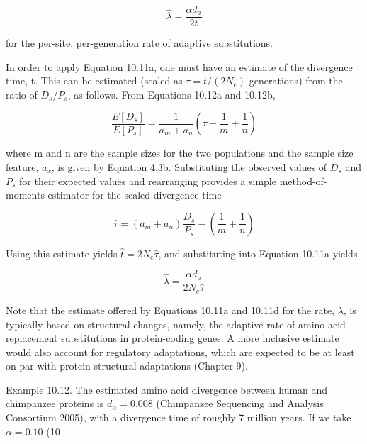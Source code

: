 \documentclass{article}
\begin{document}
\begin{equation}
\widehat{\lambda}=\frac{\alpha d_{a}}{2t}
\tag{10.11a}
\label{eq:10_11a}
\end{equation}

for the per-site, per-generation rate of adaptive substitutions.

In order to apply Equation 10.11a, one must have an estimate of the divergence time, t. This can be estimated (scaled as  $ \tau = t/(2N_e) $ generations) from the ratio of  $ D_s/P_s $, as follows. From Equations 10.12a and 10.12b,

\begin{equation}
\frac{E[D_{s}]}{E[P_{s}]}=\frac{1}{a_{m}+a_{n}}\left(\tau+\frac{1}{m}+\frac{1}{n}\right)
\tag{10.11b}
\label{eq:10_11b}
\end{equation}

where m and n are the sample sizes for the two populations and the sample size feature,  $ a_{x} $, is given by Equation 4.3b. Substituting the observed values of  $ D_{s} $ and  $ P_{s} $ for their expected values and rearranging provides a simple method-of-moments estimator for the scaled divergence time

\begin{equation}
\widehat{\tau}=\left(a_{m}+a_{n}\right)\frac{D_{s}}{P_{s}}-\left(\frac{1}{m}+\frac{1}{n}\right)
\tag{10.11c}
\label{eq:10_11c}
\end{equation}

Using this estimate yields  $ \widehat{t} = 2N_e\widehat{\tau} $, and substituting into Equation 10.11a yields

\begin{equation}
\widehat{\lambda}=\frac{\alpha d_{a}}{2N_{e}\widehat{\tau}}
\tag{10.11d}
\label{eq:10_11d}
\end{equation}

Note that the estimate offered by Equations 10.11a and 10.11d for the rate,  $ \lambda $, is typically based on structural changes, namely, the adaptive rate of amino acid replacement substitutions in protein-coding genes. A more inclusive estimate would also account for regulatory adaptations, which are expected to be at least on par with protein structural adaptations (Chapter 9).

Example 10.12. The estimated amino acid divergence between human and chimpanzee proteins is  $ d_{\alpha} = 0.008 $ (Chimpanzee Sequencing and Analysis Consortium 2005), with a divergence time of roughly 7 million years. If we take  $ \alpha = 0.10 $ (10%
\end{document}
